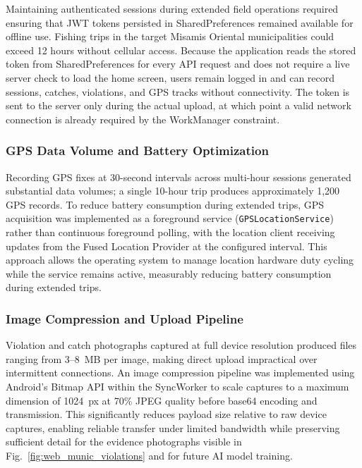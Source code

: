\documentclass[journal]{IEEEtran}
\begin{document}
Maintaining authenticated sessions during extended field operations required ensuring that
JWT tokens persisted in SharedPreferences remained available for offline use. Fishing
trips in the target Misamis Oriental municipalities could exceed 12 hours without cellular access. Because
the application reads the stored token from SharedPreferences for every API request and
does not require a live server check to load the home screen, users remain logged in and
can record sessions, catches, violations, and GPS tracks without connectivity. The token
is sent to the server only during the actual upload, at which point a valid network
connection is already required by the WorkManager constraint.

\subsubsection{GPS Data Volume and Battery Optimization}

Recording GPS fixes at 30-second intervals across multi-hour sessions generated
substantial data volumes; a single 10-hour trip produces approximately 1,200 GPS records.
To reduce battery consumption during extended trips, GPS acquisition was implemented as a
foreground service (\texttt{GPSLocationService}) rather than continuous foreground polling,
with the location client receiving updates from the Fused Location Provider at the
configured interval. This approach allows the operating system to manage location hardware
duty cycling while the service remains active, measurably reducing battery consumption
during extended trips.

\subsubsection{Image Compression and Upload Pipeline}

Violation and catch photographs captured at full device resolution produced files ranging
from 3--8~MB per image, making direct upload impractical over intermittent connections.
An image compression pipeline was implemented using Android's Bitmap API within the
SyncWorker to scale captures to a maximum dimension of 1024~px at 70\% JPEG quality
before base64 encoding and transmission. This significantly reduces payload size relative
to raw device captures, enabling reliable transfer under limited bandwidth while
preserving sufficient detail for the evidence photographs visible in
Fig.~\ref{fig:web_munic_violations} and for future AI model training.
\end{document}
